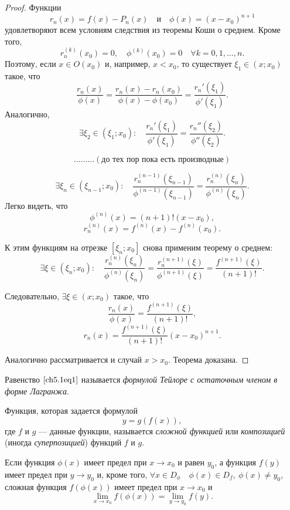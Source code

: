\begin{proof}
Функции $$r_n(x) = f(x) - P_n(x) \quad \text{и} \quad \phi(x) = (x - x_0)^{n + 1}$$ удовлетворяют всем условиям следствия из теоремы Коши о среднем. Кроме того, $$r_n^{(k)}(x_0) = 0, \quad \phi^{(k)}(x_0) = 0 \quad \forall k = 0,1,\ldots,n.$$ Поэтому, если $x \in O(x_0)$ и, например, $x < x_0$, то существует $\xi_1 \in (x; x_0)$ такое, что
$$
\frac{r_n(x)}{\phi(x)} = \frac{r_n(x) - r_n(x_0)}{\phi(x) - \phi(x_0)} = \frac{r_n'(\xi_1)}{\phi'(\xi_1)}.
$$
Аналогично,
$$
\exists \xi_2 \in (\xi_1; x_0): \quad \frac{r_n'(\xi_1)}{\phi'(\xi_1)} = \frac{r_n''(\xi_2)}{\phi''(\xi_2)}.
$$

$$\ldots\ldots\ldots (\text{до тех пор пока есть производные})$$

$$
\exists \xi_n \in (\xi_{n - 1}; x_0): \quad \frac{r_n^{(n - 1)}(\xi_{n - 1})}{\phi^{(n - 1)}(\xi_{n - 1})} = \frac{r_n^{(n)}(\xi_{n})}{\phi^{(n)}(\xi_{n})}.
$$
Легко видеть, что 
$$
\phi^{(n)}(x) = (n + 1)!(x - x_0),
$$
$$
r_n^{(n)}(x) = f^{(n)}(x) - f^{(n)}(x_0).
$$

К этим функциям на отрезке $[\xi_n; x_0]$ снова применим теорему о среднем:
$$
\exists \xi \in (\xi_n; x_0): \quad \frac{r_n^{(n)}(\xi_{n})}{\phi^{(n)}(\xi_{n})} = \frac{r_n^{(n + 1)}(\xi)}{\phi^{(n + 1)}(\xi)} = \frac{f^{(n + 1)}(\xi)}{(n + 1)!}.
$$

Следовательно, $\exists \xi \in (x; x_0)$ такое, что
$$
\frac{r_n(x)}{\phi(x)} = \frac{f^{(n + 1)}(\xi)}{(n + 1)!},
$$
$$
r_n(x) = \frac{f^{(n + 1)}(\xi)}{(n + 1)!}(x - x_0)^{n + 1}.
$$

Аналогично рассматривается и случай $x > x_0$. Теорема доказана.
\end{proof}

Равенство $\eqref{ch5.1eq1}$ называется \textit{формулой Тейлоре с остаточным членом в форме Лагранжа}.

\begin{defn}
Функция, которая задается формулой 
$$
y = g(f(x)),
$$
где $f$ и $g$ --- данные функции, называется \textit{сложной функцией} или \textit{композицией} (иногда \textit{суперпозицией}) функций $f$ и $g$.
\end{defn}

\begin{thm}
Если функция $\phi(x)$ имеет предел при $x \to x_0$ и равен $y_0$, а функция $f(y)$ имеет предел при $y \to y_0$ и, кроме того, $\forall x \in D_\phi \quad \phi(x) \in D_f, \: \phi(x) \not= y_0$, сложная функция $f(\phi(x))$ имеет предел при $x \to x_0$ и
\begin{equation} \label{ch5.1eq3}
\lim_{x \to x_0} f(\phi(x)) = \lim_{y \to y_0} f(y).
\end{equation}
\end{thm}

